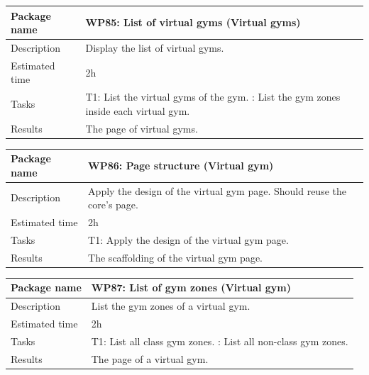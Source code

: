 \documentclass[a4paper, 12pt, oneside]{book}
\begin{document}
\vspace*{16pt}
\begin{tabularx}{\textwidth}{| l | X |}
	\hline
	\rowcolor{rowColor}
	{\semibf Package name}   & {\semibf WP85}: List of virtual gyms (Virtual gyms) \\
	\hline
	{\semibf Description}    & Display the list of virtual gyms.                   \\
	\hline
	\rowcolor{rowColor}
	{\semibf Estimated time} & 2h                                                  \\
	\hline
	{\semibf Tasks}          & {\semibf T1}: List the virtual gyms of the gym.
	\newline {\semibf T2}: List the gym zones inside each virtual gym.             \\
	\hline
	\rowcolor{rowColor}
	{\semibf Results}        & The page of virtual gyms.                           \\
	\hline
\end{tabularx}
\vspace*{16pt}
\begin{tabularx}{\textwidth}{| l | X |}
	\hline
	\rowcolor{rowColor}
	{\semibf Package name}   & {\semibf WP86}: Page structure (Virtual gym)                            \\
	\hline
	{\semibf Description}    & Apply the design of the virtual gym page. Should reuse the core's page. \\
	\hline
	\rowcolor{rowColor}
	{\semibf Estimated time} & 2h                                                                      \\
	\hline
	{\semibf Tasks}          & {\semibf T1}: Apply the design of the virtual gym page.                 \\
	\hline
	\rowcolor{rowColor}
	{\semibf Results}        & The scaffolding of the virtual gym page.                                \\
	\hline
\end{tabularx}
\vspace*{16pt}
\begin{tabularx}{\textwidth}{| l | X |}
	\hline
	\rowcolor{rowColor}
	{\semibf Package name}   & {\semibf WP87}: List of gym zones (Virtual gym) \\
	\hline
	{\semibf Description}    & List the gym zones of a virtual gym.            \\
	\hline
	\rowcolor{rowColor}
	{\semibf Estimated time} & 2h                                              \\
	\hline
	{\semibf Tasks}          & {\semibf T1}: List all class gym zones.
	\newline {\semibf T2}: List all non-class gym zones.                       \\
	\hline
	\rowcolor{rowColor}
	{\semibf Results}        & The page of a virtual gym.                      \\
	\hline
\end{tabularx}
\end{document}
